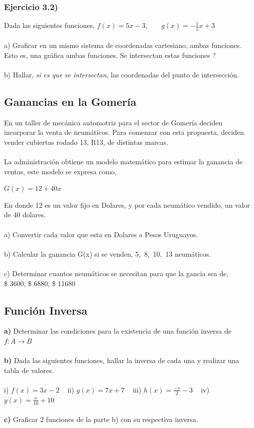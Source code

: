 \documentclass[11pt, a4paper]{article}
\begin{document}
\subsubsection*{Ejercicio 3.2) }
Dada las siguientes funciones, $f(x) = 5x - 3$, ~ ~ $\displaystyle g(x) = -\frac{1}{5}x + 3$ \\ \\ 
a) Graficar en un mismo sistema de coordenadas cartesiano, ambas funciones. Esto es, una gr\'afica ambas funciones. Se intersectan estas funciones ? \\ \\
b) Hallar, \textit{si es que se intersectan}, las coordenadas del punto de intersecci\'on. 


\subsection{ Ganancias en la Gomer\'ia }
En un taller de mec\'anica automotriz para el sector de Gomer\'ia deciden incorporar la venta de neum\'aticos. 
Para comenzar con esta propuesta, deciden vender cubiertas rodado 13, R13, de distintas marcas. \\ \\
La administraci\'on obtiene un modelo matem\'atico para estimar la ganancia de ventas, este modelo se expresa como, 
\begin{center}
    $ G(x) = 12 + 40x $
\end{center}
En donde 12 es un valor fijo en Dolares, y por cada neum\'atico vendido, un valor de 40 dolares. \\ \\
a) Convertir cada valor que esta en Dolares a Pesos Uruguayos. \\ \\
b) Calcular la ganancia G(x) si se venden, 5,~8,~10,~13 neum\'aticos. \\ \\
c) Determinar cuantos neum\'aticos se necesitan para que la gancia sea de, \\ \$ 3600, \$ 6880, \$ 11680

\subsection{ Funci\'on Inversa }

\textbf{ a) } Determinar las condiciones para la existencia de una funci\'on inversa de $f: A \to B $ \\ \\
\textbf{ b)  }
Dada las siguientes funciones, hallar la inversa de cada una y realizar una tabla de valores. \\ \\ 
i) $f(x) = 3x - 2$ ~ ii) $ g(x) = 7x + 7 $ ~ iii) $\displaystyle h(x) = \frac{-x}{2} - 3 $ ~ iv) $\displaystyle y(x) = \frac{x}{10}+10$ \\ \\
\textbf{ c) } Graficar 2 funciones de la parte b) con su respectiva inversa. 

 
\end{document}
